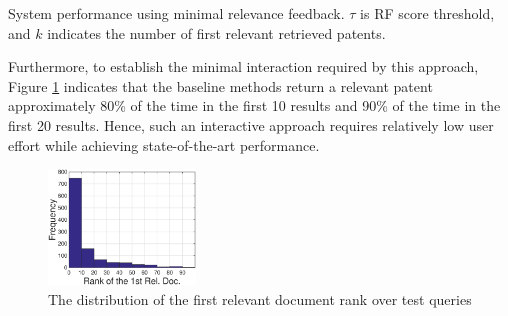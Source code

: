 \begin{table}[t!]
  \begin{center}
   \caption{System performance using minimal relevance feedback. $\tau$ is RF score threshold, and $k$ indicates the number of first relevant retrieved patents.}\vspace{3mm}
     
  \label{tab:firstrel}
  \end{center}  
\end{table}

Furthermore, to establish the minimal interaction required by this
approach, Figure \ref{fig:FirstTPRankHisto} indicates that the
baseline methods return a relevant patent approximately 80\% of the
time in the first 10 results and 90\% of the time in the first 20
results.  Hence, such an interactive approach requires relatively low
user effort while achieving state-of-the-art performance.
\begin{figure}[htpb]
   \centering
   \includegraphics[width=0.35\textwidth]{figs/1stRank.eps}
   \caption{The distribution of the first relevant document rank over test queries}   
   \label{fig:FirstTPRankHisto} 
\end{figure}
